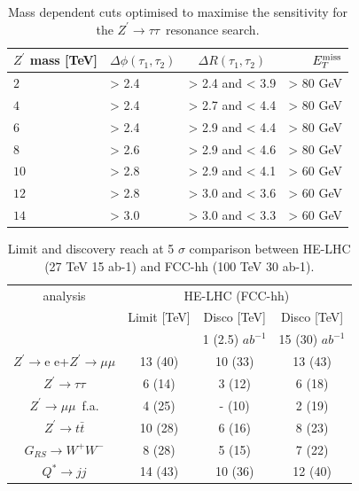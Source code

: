 \documentclass[a4paper,11pt]{article}
\newcommand{\Zp}{\ensuremath{Z^{\prime}}}
\newcommand*{\Zptata}{\ensuremath{Z^{\prime}\rightarrow \tau\tau}}
\newcommand*{\Zpee}{\ensuremath{Z^{\prime}\rightarrow \text{e e}}}
\newcommand*{\Zpmumu}{\ensuremath{Z^{\prime}\rightarrow \mu\mu}}
\newcommand*{\Zptt}{\ensuremath{Z^{\prime} \rightarrow \ttbar}}
\newcommand*{\met}{\ensuremath{E_{T}^{\rm{miss}}}}
\newcommand*{\qjj}{\ensuremath{Q^{*} \rightarrow jj}}
\newcommand*{\rsg}{\ensuremath{G_{RS} \rightarrow W^+W^-}}
\newcommand*{\ttbar}{\ensuremath{t\bar{t}}}
\begin{document}
\begin{table}[htbp]
   \centering
\begin{tabular}{|l|l|c|r|}
  \hline
  \hline
   $\Zp$ mass [TeV] &  $\Delta \phi(\tau_1, \tau_2)$&  $\Delta R(\tau_1, \tau_2)$ & $\met$\\
  \hline
   $2$ & > 2.4 & > 2.4 and < 3.9 & > 80 GeV\\
   $4$ & > 2.4 & > 2.7 and < 4.4 & > 80 GeV\\
   $6$ & > 2.4 & > 2.9 and < 4.4 & > 80 GeV\\
   $8$ & > 2.6 & > 2.9 and < 4.6 & > 80 GeV\\
  $10$ & > 2.8 & > 2.9 and < 4.1 & > 60 GeV\\
  $12$ & > 2.8 & > 3.0 and < 3.6 & > 60 GeV\\
  $14$ & > 3.0 & > 3.0 and < 3.3 & > 60 GeV\\
  \hline
  \hline
  \end{tabular}
  \caption{Mass dependent cuts optimised to maximise the sensitivity for the \Zptata\ resonance search.}
  \label{tab:leptonicresonances:selectiontautau27}
\end{table}

\begin{table}[!htb]\centering
\begin{tabular}{|c|c|c|c|}
\hline
\hline
analysis   & \multicolumn{3}{c|}{HE-LHC (FCC-hh)} \\
           & Limit [TeV] & Disco [TeV]   & Disco [TeV] \\
           &             & 1 (2.5) $ab^{-1}$ & 15 (30) $ab^{-1}$ \\
\hline
\Zpee+\Zpmumu & 13 (40) & 10 (33) & 13 (43) \\
\Zptata       &  6 (14) &  3 (12) &  6 (18) \\
\Zpmumu\ f.a. &  4 (25) &  - (10) &  2 (19) \\
\Zptt         & 10 (28) &  6 (16) &  8 (23) \\
\rsg          &  8 (28) &  5 (15) &  7 (22) \\
\qjj          & 14 (43) & 10 (36) & 12 (40) \\
\hline
\hline
\end{tabular}
\caption{Limit and discovery reach at 5 $\sigma$ comparison between HE-LHC (27 TeV 15 ab-1) and FCC-hh (100 TeV 30 ab-1).}
\label{tab:27vs100}
\end{table}




\end{document}
